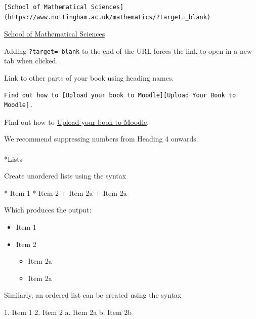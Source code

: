 \documentclass[
  letterpaper,
]{article}
\makeatletter
\let\oldparagraph\paragraph
\renewcommand{\paragraph}{
    \@ifstar
      \xxxParagraphStar
      \xxxParagraphNoStar
  }
\newcommand{\xxxParagraphStar}[1]{\oldparagraph*{#1}\mbox{}}
\newcommand{\xxxParagraphNoStar}[1]{\oldparagraph{#1}\mbox{}}
\newenvironment{Shaded}{\begin{snugshade}}{\end{snugshade}}
\newcommand{\NormalTok}[1]{\textcolor[rgb]{0.00,0.23,0.31}{#1}}
\newcommand{\SpecialStringTok}[1]{\textcolor[rgb]{0.13,0.47,0.30}{#1}}
\providecommand{\tightlist}{%
  \setlength{\itemsep}{0pt}\setlength{\parskip}{0pt}}\usepackage{longtable,booktabs,array}
\numberwithin{equation}{section}
\numberwithin{figure}{section}
\theoremstyle{break}
\makeatother
\begin{document}
\begin{verbatim}
[School of Mathematical Sciences](https://www.nottingham.ac.uk/mathematics/?target=_blank)
\end{verbatim}

\href{https://www.nottingham.ac.uk/mathematics/?target=_blank}{School of
Mathematical Sciences}

Adding \texttt{?target=\_blank} to the end of the URL forces the link to
open in a new tab when clicked.

Link to other parts of your book using heading names.

\begin{verbatim}
Find out how to [Upload your book to Moodle][Upload Your Book to Moodle].
\end{verbatim}

Find out how to \hyperref[upload-your-book-to-moodle]{Upload your book
to Moodle}.

We recommend suppressing numbers from Heading 4 onwards.

\paragraph*{Lists}\label{lists}

Create unordered lists using the syntax

\begin{Shaded}
\begin{Highlighting}[]
\SpecialStringTok{* }\NormalTok{Item 1}
\SpecialStringTok{* }\NormalTok{Item 2}
\SpecialStringTok{    + }\NormalTok{Item 2a}
\SpecialStringTok{    + }\NormalTok{Item 2a}
\end{Highlighting}
\end{Shaded}

Which produces the output:

\begin{itemize}
\tightlist
\item
  Item 1
\item
  Item 2

  \begin{itemize}
  \tightlist
  \item
    Item 2a
  \item
    Item 2a
  \end{itemize}
\end{itemize}

Similarly, an ordered list can be created using the syntax

\begin{Shaded}
\begin{Highlighting}[]
\SpecialStringTok{1. }\NormalTok{Item 1}
\SpecialStringTok{2. }\NormalTok{Item 2}
\NormalTok{    a. Item 2a}
\NormalTok{    b. Item 2b}
\end{Highlighting}
\end{Shaded}
\end{document}
